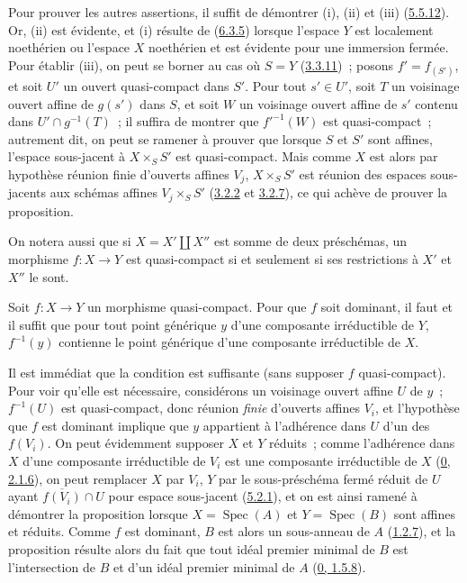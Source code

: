 Pour prouver les autres assertions, il suffit de démontrer (i), (ii) et (iii)
(\hyperref[I.5.5.12-fr]{5.5.12}). Or, (ii) est évidente, et (i) résulte de
(\hyperref[I.6.3.5-fr]{6.3.5}) lorsque l'espace $Y$ est localement noethérien
ou l'espace $X$ noethérien et est évidente pour une immersion fermée. Pour
établir (iii),
on peut se borner au cas où $S=Y$ (\hyperref[I.3.3.11-fr]{3.3.11})~; posons
$f'=f_{(S')}$, et soit $U'$ un ouvert quasi-compact dans $S'$. Pour tout
$s'\in U'$, soit $T$ un voisinage ouvert affine de $g(s')$ dans $S$, et soit
$W$ un voisinage ouvert affine de $s'$ contenu dans
$U'\cap g^{-1}(T)$~; il suffira de montrer que $f'^{-1}(W)$ est
quasi-compact~; autrement dit, on peut se ramener à prouver que lorsque $S$
et $S'$ sont affines, l'espace sous-jacent à $X\times_S S'$ est
quasi-compact. Mais comme $X$ est alors par hypothèse réunion finie d'ouverts
affines $V_j$, $X\times_S S'$ est réunion des espaces sous-jacents aux
schémas affines $V_j\times_S S'$
(\hyperref[I.3.2.2-fr]{3.2.2} et \hyperref[I.3.2.7-fr]{3.2.7}), ce qui achève
de prouver la proposition.

On notera aussi que si $X=X'\amalg X''$ est somme de deux préschémas, un
morphisme $f:X\to Y$ est quasi-compact si et seulement si ses restrictions à
$X'$ et $X''$ le sont.

\begin{proposition}[6.6.5]
\label{I.6.6.5-fr}
Soit $f:X\to Y$ un morphisme quasi-compact. Pour que $f$ soit dominant, il
faut et il suffit que pour tout point générique $y$ d'une composante
irréductible de $Y$, $f^{-1}(y)$ contienne le point générique d'une composante
irréductible de $X$.
\end{proposition}

Il est immédiat que la condition est suffisante (sans supposer $f$
quasi-compact). Pour voir qu'elle est nécessaire, considérons un voisinage
ouvert affine $U$ de $y$~; $f^{-1}(U)$ est quasi-compact, donc réunion
\emph{finie} d'ouverts affines $V_i$, et l'hypothèse que $f$ est dominant
implique que $y$ appartient à l'adhérence dans $U$ d'un des $f(V_i)$. On peut
évidemment supposer $X$ et $Y$ réduits~; comme l'adhérence dans $X$ d'une
composante irréductible de $V_i$ est une composante irréductible de $X$
(\hyperref[0.2.1.6-fr]{0, 2.1.6}), on peut remplacer $X$ par $V_i$, $Y$ par
le sous-préschéma fermé réduit de $U$ ayant $\overline{f(V_i)}\cap U$ pour
espace sous-jacent (\hyperref[I.5.2.1-fr]{5.2.1}), et on est ainsi ramené à
démontrer la proposition lorsque $X=\operatorname{Spec}(A)$ et
$Y=\operatorname{Spec}(B)$ sont affines et réduits. Comme $f$ est dominant,
$B$ est alors un sous-anneau de $A$ (\hyperref[I.1.2.7-fr]{1.2.7}), et la
proposition résulte alors du fait que tout idéal premier minimal de $B$ est
l'intersection de $B$ et d'un idéal premier minimal de $A$
(\hyperref[0.1.5.8-fr]{0, 1.5.8}).

